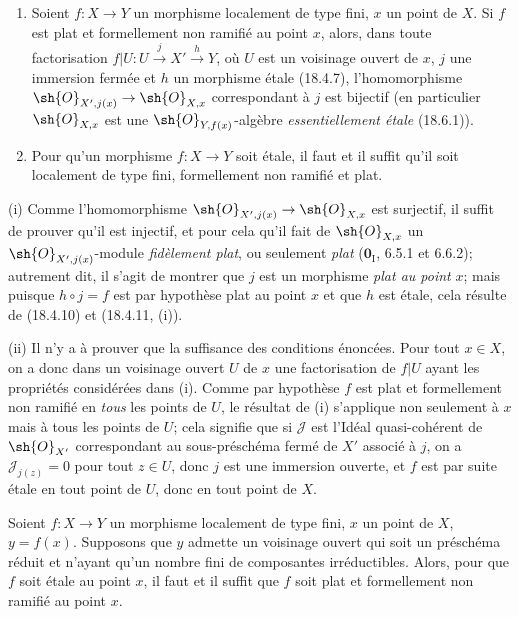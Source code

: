 \begin{corollary}[18.4.12]
\label{IV.18.4.12}
\begin{enumerate}
  \item[\textup{(i)}] Soient $f:X\to Y$ un morphisme localement de type fini, $x$ un point de $X$. Si $f$ est plat et formellement non ramifié au point $x$, alors, dans toute factorisation $f|U:U\xrightarrow{j}X'\xrightarrow{h}Y$, où $U$ est un voisinage ouvert de $x$, $j$ une immersion fermée et $h$ un morphisme étale \textup{(18.4.7)}, l'homomorphisme $\sh{O}_{X',j(x)}\to\sh{O}_{X,x}$ correspondant à $j$ est bijectif \textup{(en particulier $\sh{O}_{X,x}$ est une $\sh{O}_{Y,f(x)}$-algèbre \emph{essentiellement étale} (18.6.1))}.
  \item[\textup{(ii)}] Pour qu'un morphisme $f:X\to Y$ soit étale, il faut et il suffit qu'il soit localement de type fini, formellement non ramifié et plat.
\end{enumerate}
\end{corollary}

(i) Comme l'homomorphisme $\sh{O}_{X',j(x)}\to\sh{O}_{X,x}$ est surjectif, il suffit de prouver qu'il est injectif, et pour cela qu'il fait de $\sh{O}_{X,x}$ un $\sh{O}_{X',j(x)}$-module \emph{fidèlement plat}, ou seulement \emph{plat} ($\mathbf{0}_{\mathrm I}$, 6.5.1 et 6.6.2); autrement dit, il s'agit de montrer que $j$ est un morphisme \emph{plat au point} $x$; mais puisque $h\circ j=f$ est par hypothèse plat au point $x$ et que $h$ est étale, cela résulte de (18.4.10) et (18.4.11, (i)).

(ii) Il n'y a à prouver que la suffisance des conditions énoncées. Pour tout $x\in X$, on a donc dans un voisinage ouvert $U$ de $x$ une factorisation de $f|U$ ayant les propriétés considérées dans (i). Comme par hypothèse $f$ est plat et formellement non ramifié en \emph{tous} les points de $U$, le résultat de (i) s'applique non seulement à $x$ mais à tous les points de $U$; cela signifie que si $\mathscr J$ est l'Idéal quasi-cohérent de $\sh{O}_{X'}$ correspondant au sous-préschéma fermé de $X'$ associé à $j$, on a $\mathscr J_{j(z)}=0$ pour tout $z\in U$, donc $j$ est une immersion ouverte, et $f$ est par suite étale en tout point de $U$, donc en tout point de $X$.

\begin{corollary}[18.4.13]
\label{IV.18.4.13}
Soient $f:X\to Y$ un morphisme localement de type fini, $x$ un point de $X$, $y=f(x)$. Supposons que $y$ admette un voisinage ouvert qui soit un préschéma réduit et n'ayant qu'un nombre fini de composantes irréductibles. Alors, pour que $f$ soit étale au point $x$, il faut et il suffit que $f$ soit plat et formellement non ramifié au point $x$.
\end{corollary}

